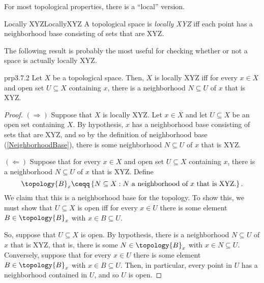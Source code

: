 For most topological properties, there is a ``local'' version.
\begin{mdf}{Locally XYZ}{LocallyXYZ}
A topological space is \emph{locally XYZ} iff each point has a neighborhood base consisting of sets that are XYZ.
\end{mdf}
The following result is probably the most useful for checking whether or not a space is actually locally XYZ.
\begin{mpr}{}{prp3.7.2}
Let $X$ be a topological space.  Then, $X$ is locally XYZ iff for every $x\in X$ and open set $U\subseteq X$ containing $x$, there is a neighborhood $N\subseteq U$ of $x$ that is XYZ.
\begin{proof}
$(\Rightarrow )$ Suppose that $X$ is locally XYZ.  Let $x\in X$ and let $U\subseteq X$ be an open set containing $X$.  By hypothesis, $x$ has a neighborhood base consisting of sets that are XYZ, and so by the definition of neighborhood base (\cref{NeighborhoodBase}), there is some neighborhood $N\subseteq U$ of $x$ that is XYZ.

\blankline
\noindent
$(\Leftarrow )$ Suppose that for every $x\in X$ and open set $U\subseteq X$ containing $x$, there is a neighborhood $N\subseteq U$ of $x$ that is XYZ.  Define
\begin{equation}
\topology{B}_x\ceqq \left\{ N\subseteq X:N\text{ a neighborhood of }x\text{ that is XYZ.}\right\} .
\end{equation}
We claim that this is a neighborhood base for the topology.  To show this, we must show that $U\subseteq X$ is open iff for every $x\in U$ there is some element $B\in \topology{B}_x$ with $x\in B\subseteq U$.

So, suppose that $U\subseteq X$ is open.  By hypothesis, there is a neighborhood $N\subseteq U$ of $x$ that is XYZ, that is, there is some $N\in \topology{B}_x$ with $x\in N\subseteq U$.  Conversely, suppose that for every $x\in U$ there is some element $B\in \topology{B}_x$ with $x\in B\subseteq U$.  Then, in particular, every point in $U$ has a neighborhood contained in $U$, and so $U$ is open.
\end{proof}
\end{mpr}

